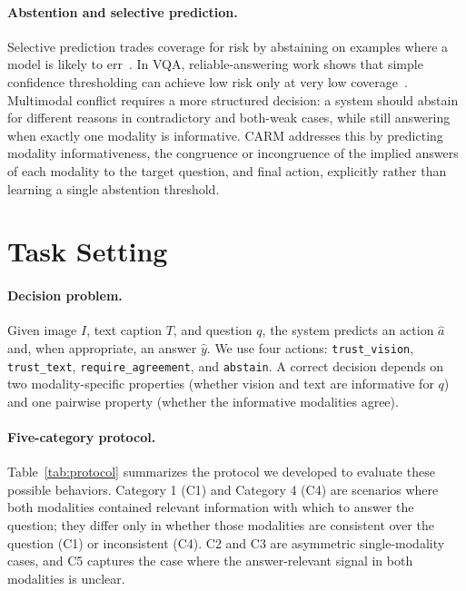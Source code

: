 \documentclass[11pt]{article}
\begin{document}
\paragraph{Abstention and selective prediction.}
Selective prediction trades coverage for risk by abstaining on examples where a model is
likely to err~\citep{geifmanSelectiveClassificationDeep2017,kamathSelectiveQuestionAnswering2020,wenKnowYourLimits2025}.
In VQA, reliable-answering work shows that simple confidence thresholding can achieve low
risk only at very low coverage~\citep{whiteheadReliableVisualQuestion2022}. Multimodal
conflict requires a more structured decision: a system should abstain for different reasons
in contradictory and both-weak cases, while still answering when exactly one modality is
informative. CARM addresses this by predicting modality informativeness, the congruence or incongruence of the implied answers of each modality to the target question, and
final action, explicitly rather than learning a single abstention threshold.


\section{Task Setting}
\label{sec:task}

\paragraph{Decision problem.}
Given image $I$, text caption $T$, and question $q$, the system predicts an action
$\hat{a}$ and, when appropriate, an answer $\hat{y}$. We use four actions:
\texttt{trust\_vision}, \texttt{trust\_text}, \texttt{require\_agreement}, and
\texttt{abstain}. A correct decision depends on two modality-specific properties
(whether vision and text are informative for $q$) and one pairwise property
(whether the informative modalities agree).

\paragraph{Five-category protocol.}
Table~\ref{tab:protocol} summarizes the protocol we developed to evaluate these possible behaviors. Category 1 (C1) and Category 4 (C4) are scenarios where both modalities contained relevant information with which to answer the question; they differ only in whether those modalities are consistent over the question (C1) or inconsistent (C4). C2 and C3 are asymmetric single-modality cases, and C5 captures the case where the answer-relevant signal in both modalities is unclear.
\end{document}

